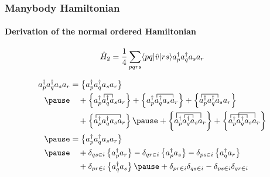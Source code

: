 \begin{frame}[fragile]
    \frametitle{Manybody Hamiltonian}
    \framesubtitle{Derivation of the normal ordered Hamiltonian}

    \begin{equation*}
        \hat{H}_2 = \frac{1}{4} \sum_{pqrs} \langle pq |\hat{v}|rs\rangle a^\dagger_p a^\dagger_q a_s  a_r
    \end{equation*}

\begin{align*}
    a^\dagger_p a^\dagger_q a_s  a_r &= 
        \normord{a^\dagger_p a^\dagger_q a_s  a_r} \nn \pause
        & \quad + \normord{
            \contraction{a^\dagger_p}{a}{{}^\dagger_q}{a}
            a^\dagger_p a^\dagger_q a_s  a_r}
        + \normord{
            \contraction{a^\dagger_p}{a}{{}^\dagger_q a_s}{a}
            a^\dagger_p a^\dagger_q a_s  a_r}
        + \normord{
            \contraction{}{a}{{}^\dagger_p a^\dagger_q}{a}
            a^\dagger_p a^\dagger_q a_s  a_r} \nn
        & \quad + \normord{
            \contraction{}{a}{{}^\dagger_p a^\dagger_q a_s}{a}
            a^\dagger_p a^\dagger_q a_s  a_r} \pause
        + \normord{
            \contraction[1.5ex]{}{a}{{}^\dagger_p a_q^\dagger a_s}{a}
            \contraction{a^\dagger_p}{a}{{}^\dagger_q}{a}
            a^\dagger_p a^\dagger_q a_s  a_r}
        + \normord{
            \contraction{}{a}{{}^\dagger_p a_q^\dagger}{a}
            \contraction[1.5ex]{a^\dagger_p}{a}{{}^\dagger_q a_s}{a}
            a^\dagger_p a^\dagger_q a_s  a_r} \nn \pause
    &= \normord{a^\dagger_p a^\dagger_q a_s  a_r} \nn \pause
        & \quad + \delta_{qs\in i} \normord{ a^\dagger_p a_r}
        - \delta_{qr \in i} \normord{a^\dagger_p a_s}
        - \delta_{ps \in i} \normord{a^\dagger_q a_r} \nn
        & \quad + \delta_{pr \in i} \normord{a^\dagger_q a_s} \pause
        + \delta_{pr \in i} \delta_{qs \in i} - \delta_{ps \in i} \delta_{qr \in i}
\end{align*}

\end{frame}
